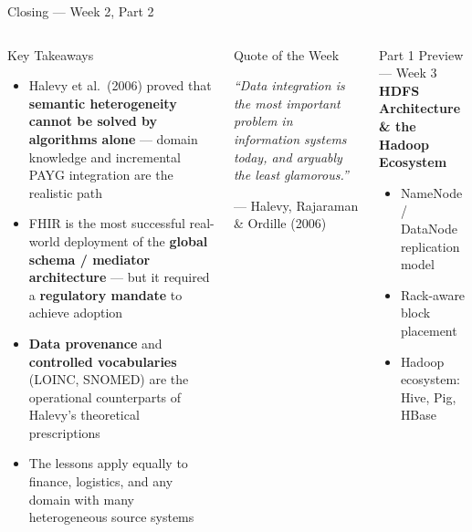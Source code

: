 \documentclass[aspectratio=169,10pt]{beamer}
\begin{document}
\begin{frame}{Closing — Week 2, Part 2}
  \begin{columns}[T]
      \begin{block}{Key Takeaways}
        \begin{itemize}
          \item Halevy et al.\ (2006) proved that \textbf{semantic
                heterogeneity cannot be solved by algorithms alone} —
                domain knowledge and incremental PAYG integration
                are the realistic path
          \item FHIR is the most successful real-world deployment of
                the \textbf{global schema / mediator architecture} —
                but it required a \textbf{regulatory mandate} to achieve adoption
          \item \textbf{Data provenance} and \textbf{controlled vocabularies}
                (LOINC, SNOMED) are the operational counterparts of
                Halevy's theoretical prescriptions
          \item The lessons apply equally to finance, logistics,
                and any domain with many heterogeneous source systems
        \end{itemize}
      \end{block}

      \begin{alertblock}{Quote of the Week}
        \begin{center}
        \large\itshape
        ``Data integration is the most important
        problem in information systems today,
        and arguably the least glamorous.''
        \end{center}
        \begin{flushright}
        \small --- Halevy, Rajaraman \& Ordille (2006)
        \end{flushright}
      \end{alertblock}
      \vspace{6pt}
      \begin{exampleblock}{Part 1 Preview — Week 3}
        \textbf{HDFS Architecture \& the Hadoop Ecosystem}\\[3pt]
        \begin{itemize}\setlength\itemsep{1pt}
          \item NameNode / DataNode replication model
          \item Rack-aware block placement
          \item Hadoop ecosystem: Hive, Pig, HBase
        \end{itemize}
      \end{exampleblock}
  \end{columns}
\end{frame}

\end{document}
